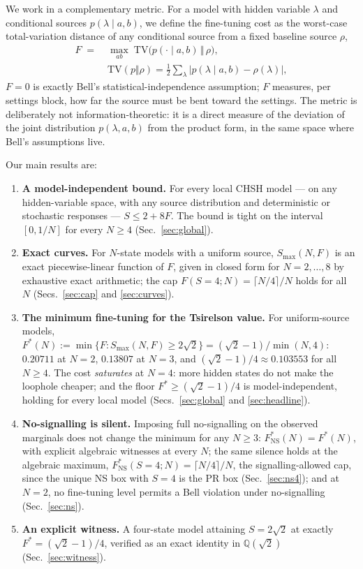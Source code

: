 \documentclass[aps,pra,reprint,superscriptaddress,floatfix]{revtex4-2}
\newcommand{\TV}{\mathrm{TV}}
\begin{document}
We work in a complementary metric. For a model with hidden variable $\lambda$
and conditional sources $p(\lambda\mid a,b)$, we define the fine-tuning cost
as the worst-case total-variation distance of any conditional source from a
fixed baseline source $\rho$,
\begin{equation}
\begin{aligned}
F \;=\; & \max_{ab}\; \TV\bigl(p(\cdot\mid a,b)\,\Vert\,\rho\bigr),\\
& \TV(p\Vert\rho)=\tfrac12\sum_\lambda |p(\lambda\mid a,b)-\rho(\lambda)| ,
\end{aligned}
\label{eq:Fdef}
\end{equation}
$F=0$ is exactly Bell's statistical-independence assumption; $F$ measures,
per settings block, how far the source must be bent toward the settings. The
metric is deliberately not information-theoretic: it is a direct measure of
the deviation of the joint distribution $p(\lambda,a,b)$ from the product
form, in the same space where Bell's assumptions live.

Our main results are:
\begin{enumerate}
\item \textbf{A model-independent bound.} For every local CHSH model --- on
any hidden-variable space, with any source distribution and deterministic or
stochastic responses --- $S\le 2+8F$. The bound is tight on the interval
$[0,1/N]$ for every $N\ge 4$ (Sec.~\ref{sec:global}).
\item \textbf{Exact curves.} For $N$-state models with a uniform source,
$S_{\max}(N,F)$ is an exact piecewise-linear function of $F$, given in closed
form for $N=2,\dots,8$ by exhaustive exact arithmetic; the cap
$F(S{=}4;N)=\lceil N/4\rceil/N$ holds for all $N$
(Secs.~\ref{sec:cap} and \ref{sec:curves}).
\item \textbf{The minimum fine-tuning for the Tsirelson value.} For
uniform-source models,
$F^*(N):=\min\{F:S_{\max}(N,F)\ge 2\sqrt{2}\}=(\sqrt{2}-1)/\min(N,4)$:
$0.20711$ at $N=2$, $0.13807$ at $N=3$, and $(\sqrt{2}-1)/4\approx 0.103553$
for all $N\ge 4$. The cost \emph{saturates} at $N=4$: more hidden states do
not make the loophole cheaper; and the floor $F^*\ge(\sqrt{2}-1)/4$ is
model-independent, holding for every local model (Secs.~\ref{sec:global} and
\ref{sec:headline}).
\item \textbf{No-signalling is silent.} Imposing full no-signalling on the
observed marginals does not change the minimum for any $N\ge 3$:
$F^*_{\mathrm{NS}}(N)=F^*(N)$, with explicit algebraic witnesses at every
$N$; the same silence holds at the algebraic maximum,
$F^*_{\mathrm{NS}}(S{=}4;N)=\lceil N/4\rceil/N$, the signalling-allowed cap,
since the unique NS box with $S=4$ is the PR box
(Sec.~\ref{sec:ns4}); and at $N=2$, no fine-tuning level permits a Bell
violation under no-signalling (Sec.~\ref{sec:ns}).
\item \textbf{An explicit witness.} A four-state model attaining
$S=2\sqrt{2}$ at exactly $F^*=(\sqrt{2}-1)/4$, verified as an exact identity
in $\mathbb{Q}(\sqrt{2})$ (Sec.~\ref{sec:witness}).
\end{enumerate}
\end{document}

